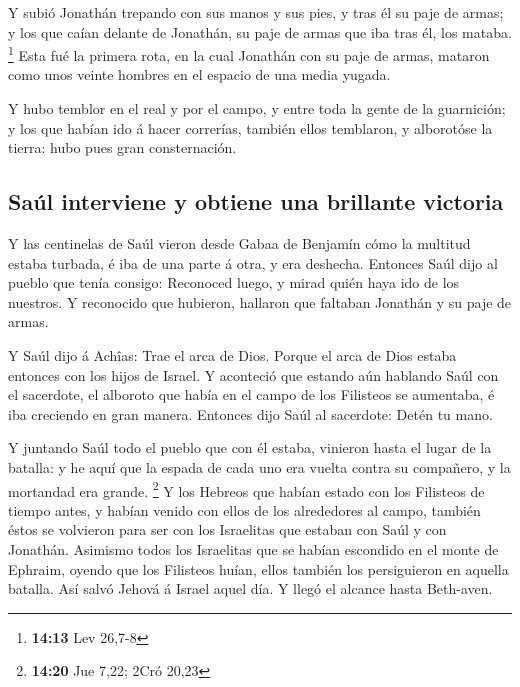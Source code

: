  Y subió Jonathán trepando con sus manos y sus pies, y
tras él su paje de armas; y los que caían delante de Jonathán, su paje
de armas que iba tras él, los mataba. \footnote{\textbf{14:13} Lev
  26,7-8}  Esta fué la primera rota, en la cual Jonathán
con su paje de armas, mataron como unos veinte hombres en el espacio de
una media yugada.

 Y hubo temblor en el real y por el campo, y entre toda
la gente de la guarnición; y los que habían ido á hacer correrías,
también ellos temblaron, y alborotóse la tierra: hubo pues gran
consternación.

\hypertarget{sauxfal-interviene-y-obtiene-una-brillante-victoria}{%
\subsection{Saúl interviene y obtiene una brillante
victoria}\label{sauxfal-interviene-y-obtiene-una-brillante-victoria}}

 Y las centinelas de Saúl vieron desde Gabaa de Benjamín
cómo la multitud estaba turbada, é iba de una parte á otra, y era
deshecha.  Entonces Saúl dijo al pueblo que tenía
consigo: Reconoced luego, y mirad quién haya ido de los nuestros. Y
reconocido que hubieron, hallaron que faltaban Jonathán y su paje de
armas.

 Y Saúl dijo á Achîas: Trae el arca de Dios. Porque el
arca de Dios estaba entonces con los hijos de Israel.  Y
aconteció que estando aún hablando Saúl con el sacerdote, el alboroto
que había en el campo de los Filisteos se aumentaba, é iba creciendo en
gran manera. Entonces dijo Saúl al sacerdote: Detén tu mano.

 Y juntando Saúl todo el pueblo que con él estaba,
vinieron hasta el lugar de la batalla: y he aquí que la espada de cada
uno era vuelta contra su compañero, y la mortandad era grande.
\footnote{\textbf{14:20} Jue 7,22; 2Cró 20,23}  Y los
Hebreos que habían estado con los Filisteos de tiempo antes, y habían
venido con ellos de los alrededores al campo, también éstos se volvieron
para ser con los Israelitas que estaban con Saúl y con Jonathán.
 Asimismo todos los Israelitas que se habían escondido en
el monte de Ephraim, oyendo que los Filisteos huían, ellos también los
persiguieron en aquella batalla.  Así salvó Jehová á
Israel aquel día. Y llegó el alcance hasta Beth-aven.

